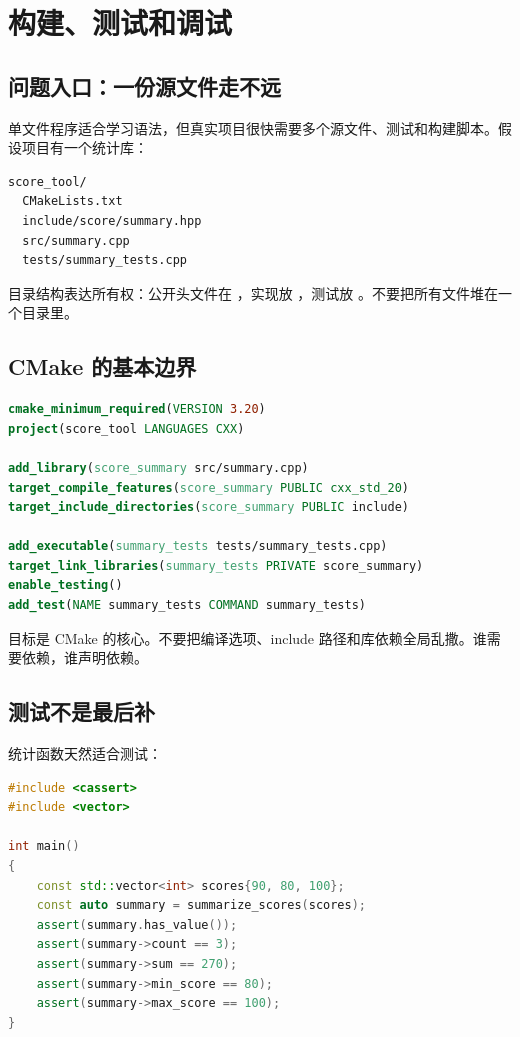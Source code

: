 \chapter{构建、测试和调试}

\section{问题入口：一份源文件走不远}

单文件程序适合学习语法，但真实项目很快需要多个源文件、测试和构建脚本。假设项目有一个统计库：

\begin{lstlisting}[caption={最小项目结构}]
score_tool/
  CMakeLists.txt
  include/score/summary.hpp
  src/summary.cpp
  tests/summary_tests.cpp
\end{lstlisting}

目录结构表达所有权：公开头文件在 ，实现放 ，测试放 。不要把所有文件堆在一个目录里。

\section{CMake 的基本边界}

\begin{lstlisting}[language=CMake,caption={库和测试目标分开}]
cmake_minimum_required(VERSION 3.20)
project(score_tool LANGUAGES CXX)

add_library(score_summary src/summary.cpp)
target_compile_features(score_summary PUBLIC cxx_std_20)
target_include_directories(score_summary PUBLIC include)

add_executable(summary_tests tests/summary_tests.cpp)
target_link_libraries(summary_tests PRIVATE score_summary)
enable_testing()
add_test(NAME summary_tests COMMAND summary_tests)
\end{lstlisting}

目标是 CMake 的核心。不要把编译选项、include 路径和库依赖全局乱撒。谁需要依赖，谁声明依赖。

\section{测试不是最后补}

统计函数天然适合测试：

\begin{lstlisting}[language=C++,caption={不用测试框架也能先写断言}]
#include <cassert>
#include <vector>

int main()
{
    const std::vector<int> scores{90, 80, 100};
    const auto summary = summarize_scores(scores);
    assert(summary.has_value());
    assert(summary->count == 3);
    assert(summary->sum == 270);
    assert(summary->min_score == 80);
    assert(summary->max_score == 100);
}
\end{lstlisting}

